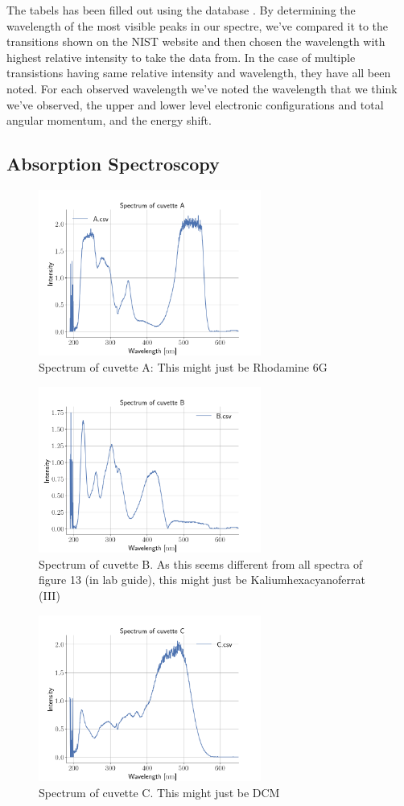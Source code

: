 The tabels has been filled out using the database . By determining the wavelength of the most visible peaks in our spectre, we've compared it to the transitions shown on the NIST website and then chosen the wavelength with highest relative intensity to take the data from. In the case of multiple transistions having same relative intensity and wavelength, they have all been noted. For each observed wavelength we've noted the wavelength that we think we've observed, the upper and lower level electronic configurations and total angular momentum, and the energy shift. 




\subsection{Absorption Spectroscopy}
\begin{figure}[h]
\centering
\includegraphics[width=0.65\textwidth]{absA}
\caption{Spectrum of cuvette A: This might just be Rhodamine 6G}
\label{fig:absA}
\end{figure}
\begin{figure}[h]
\centering
\includegraphics[width=0.65\textwidth]{absB}
\caption{Spectrum of cuvette B. As this seems different from all spectra of
figure 13 (in lab guide), this might just be Kaliumhexacyanoferrat (III)}
\label{fig:absB}
\end{figure}
\begin{figure}[h]
\centering
\includegraphics[width=0.65\textwidth]{absC}
\caption{Spectrum of cuvette C. This might just be DCM}
\label{fig:absC}
\end{figure}
